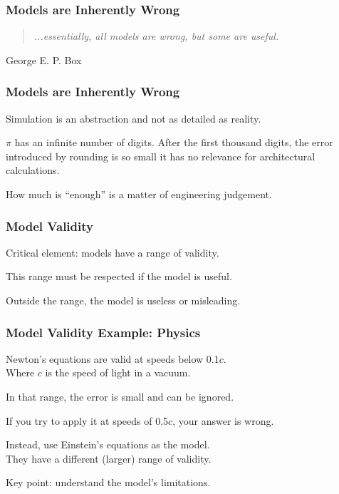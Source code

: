 \begin{frame}
\frametitle{Models are Inherently Wrong}
\begin{changemargin}{1cm}

\begin{quote}
\textit{...essentially, all models are wrong, but some are useful.}
\end{quote}
\hfill George E. P. Box

\end{changemargin}
\end{frame}

\begin{frame}
\frametitle{Models are Inherently Wrong}
\begin{changemargin}{1cm}

Simulation is an abstraction and not as detailed as reality.

$\pi$ has an infinite number of digits. After the first thousand digits, the error introduced by rounding is so small it has no relevance for architectural calculations. 

How much is ``enough'' is a matter of engineering judgement.

\end{changemargin}
\end{frame}

\begin{frame}
\frametitle{Model Validity}
\begin{changemargin}{1cm}
Critical element: models have a range of validity.

This range must be respected if the model is useful.

Outside the range, the model is useless or misleading.

\end{changemargin}
\end{frame}


\begin{frame}
\frametitle{Model Validity Example: Physics}
\begin{changemargin}{1cm}
Newton's equations are valid at speeds below 0.1$c$.\\
\quad \small{Where $c$ is the speed of light in a vacuum.}

In that range, the error is small and can be ignored.

If you try to apply it at speeds of 0.5$c$, your answer is wrong.

Instead, use Einstein's equations as the model.\\
\quad They have a different (larger) range of validity.

Key point: understand the model's limitations.

\end{changemargin}
\end{frame}


